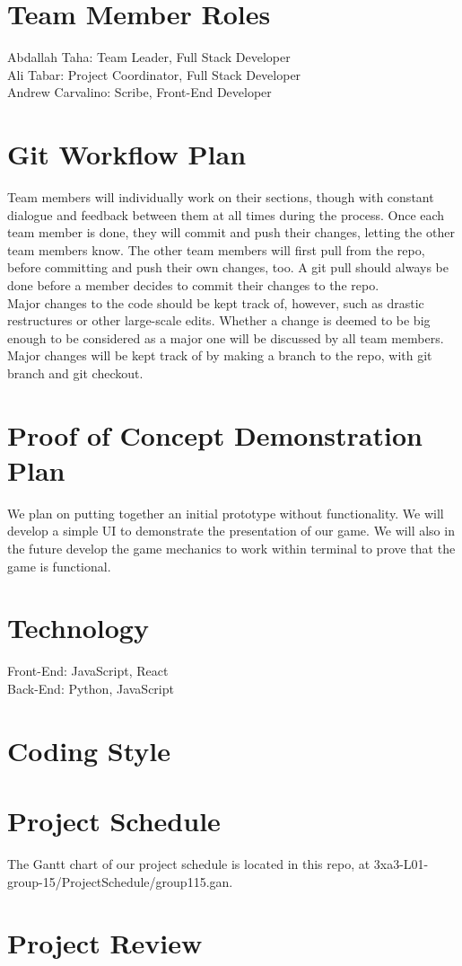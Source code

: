 \documentclass{article}
\begin{document}
\section{Team Member Roles}
Abdallah Taha: Team Leader, Full Stack Developer \\
Ali Tabar: Project Coordinator, Full Stack Developer \\
Andrew Carvalino: Scribe, Front-End Developer \\

\section{Git Workflow Plan}

Team members will individually work on their sections, though with constant dialogue and feedback between them at all times during the process. Once each team member is done, they will commit and push their changes, letting the other team members know. The other team members will first pull from the repo, before committing and push their own changes, too. A git pull should always be done before a member decides to commit their changes to the repo.\\
Major changes to the code should be kept track of, however, such as drastic restructures or other large-scale edits. Whether a change is deemed to be big enough to be considered as a major one will be discussed by all team members. Major changes will be kept track of by making a branch to the repo, with git branch and git checkout.


\section{Proof of Concept Demonstration Plan}
We plan on putting together an initial prototype without functionality. We will develop a simple UI to demonstrate the presentation of our game. We will also in the future develop the game mechanics to work within terminal to prove that the game is functional.

\section{Technology}
Front-End: JavaScript, React\\
Back-End: Python, JavaScript

\section{Coding Style}


\section{Project Schedule}

The Gantt chart of our project schedule is located in this repo, at 3xa3-L01-group-15/ProjectSchedule/group115.gan.

\section{Project Review}
\end{document}

